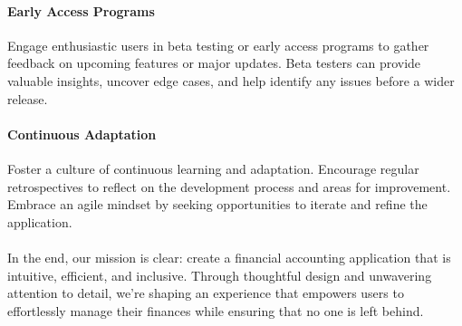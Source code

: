 \paragraph{Early Access Programs}
Engage enthusiastic users in beta testing or early access programs to gather feedback on upcoming features or 
major updates. Beta testers can provide valuable insights, uncover edge cases, and help identify any issues 
before a wider release.

\paragraph{Continuous Adaptation}
Foster a culture of continuous learning and adaptation. Encourage regular retrospectives to reflect on the development 
process and areas for improvement. Embrace an agile mindset by seeking opportunities to iterate and refine the 
application.\\
\\

\noindent In the end, our mission is clear: create a financial accounting application that is intuitive, efficient, 
and inclusive. Through thoughtful design and unwavering attention to detail, we're shaping an experience that empowers 
users to effortlessly manage their finances while ensuring that no one is left behind.
